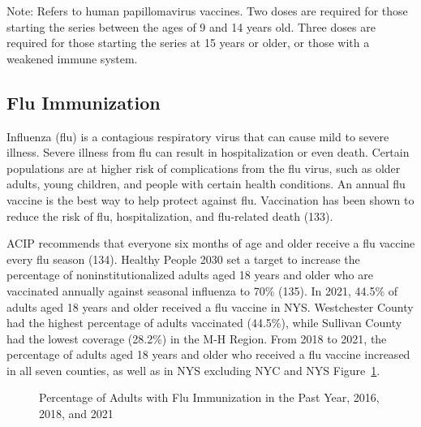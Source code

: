 \documentclass[
  english,
  letterpaper,
]{report}
\begin{document}
\begin{tcolorbox}[enhanced jigsaw, breakable, leftrule=.75mm, title=\textcolor{quarto-callout-note-color}{\faInfo}\hspace{0.5em}{Note}, bottomrule=.15mm, opacityback=0, left=2mm, colback=white, bottomtitle=1mm, coltitle=black, colbacktitle=quarto-callout-note-color!10!white, colframe=quarto-callout-note-color-frame, opacitybacktitle=0.6, toptitle=1mm, titlerule=0mm, arc=.35mm, rightrule=.15mm, toprule=.15mm]

Note: Refers to human papillomavirus vaccines. Two doses are required
for those starting the series between the ages of 9 and 14 years old.
Three doses are required for those starting the series at 15 years or
older, or those with a weakened immune system.

\end{tcolorbox}

\subsection{Flu Immunization}\label{flu-immunization}

Influenza (flu) is a contagious respiratory virus that can cause mild to
severe illness. Severe illness from flu can result in hospitalization or
even death. Certain populations are at higher risk of complications from
the flu virus, such as older adults, young children, and people with
certain health conditions. An annual flu vaccine is the best way to help
protect against flu. Vaccination has been shown to reduce the risk of
flu, hospitalization, and flu-related death (133).

ACIP recommends that everyone six months of age and older receive a flu
vaccine every flu season (134). Healthy People 2030 set a target to
increase the percentage of noninstitutionalized adults aged 18 years and
older who are vaccinated annually against seasonal influenza to 70\%
(135). In 2021, 44.5\% of adults aged 18 years and older received a flu
vaccine in NYS. Westchester County had the highest percentage of adults
vaccinated (44.5\%), while Sullivan County had the lowest coverage
(28.2\%) in the M-H Region. From 2018 to 2021, the percentage of adults
aged 18 years and older who received a flu vaccine increased in all
seven counties, as well as in NYS excluding NYC and NYS
Figure~\ref{fig-adult-flu-immi-lastyear-percent}.

\begin{figure}


\caption{\label{fig-adult-flu-immi-lastyear-percent}Percentage of Adults
with Flu Immunization in the Past Year, 2016, 2018, and 2021}

\end{figure}%
\end{document}
